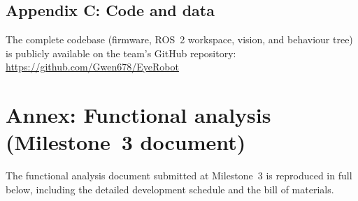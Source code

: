 \documentclass[11pt]{article}
\begin{document}
\subsection*{Appendix C: Code and data}
The complete codebase (firmware, ROS~2 workspace, vision, and behaviour tree) is publicly available on the team's GitHub repository: \\
\url{https://github.com/Gwen678/EyeRobot}

\pagebreak




\cleardoublepage
{}
{}
\section*{Annex: Functional analysis (Milestone~3 document)}
The functional analysis document submitted at Milestone~3 is reproduced in full below, including the detailed development schedule and the bill of materials.

\end{document}

